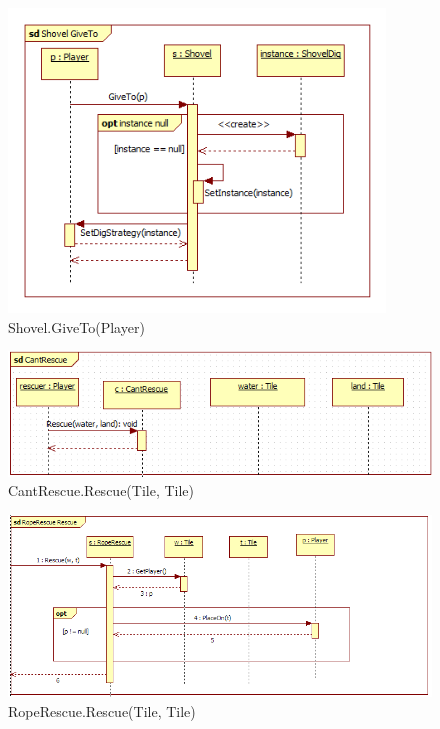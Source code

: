 \begin{figure}[H]
	\begin{center}
		\includegraphics[width=10cm]{chapters/chapter04/seqdiag/Shovel_GiveTo.png}
		\caption{Shovel.GiveTo(Player)}
		\label{fig:ShovelGiveTo}
	\end{center}
\end{figure}
\begin{figure}[H]
	\begin{center}
		\includegraphics[width=13cm]{chapters/chapter04/seqdiag/CantRescue_Rescue.png}
		\caption{CantRescue.Rescue(Tile, Tile)}
		\label{fig:CantRescueRescue}
	\end{center}
\end{figure}
\begin{figure}[H]
	\begin{center}
		\includegraphics[width=13cm]{chapters/chapter04/seqdiag/RopeRescue_Rescue.png}
		\caption{RopeRescue.Rescue(Tile, Tile)}
		\label{fig:RopeRescueRescue}
	\end{center}
\end{figure}
